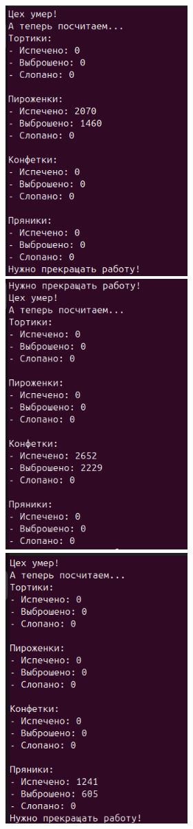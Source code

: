 \documentclass[a4paper,14pt]{extarticle}
\begin{document}
\includegraphics[width=70mm]{processes_output_6_2}
\includegraphics[width=70mm]{processes_output_6_3}
\includegraphics[width=70mm]{processes_output_6_4}
\end{document}
